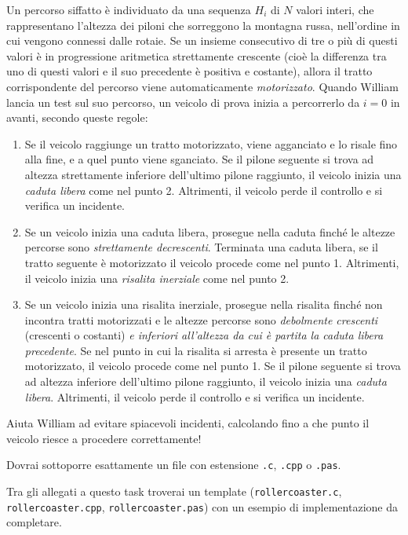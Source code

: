 	Un percorso siffatto \`e individuato da una sequenza $H_i$ di $N$ valori interi, che rappresentano l'altezza dei piloni che sorreggono la montagna russa, nell'ordine in cui vengono connessi dalle rotaie. Se un insieme consecutivo di tre o pi\`u di questi valori \`e in progressione aritmetica strettamente crescente (cio\`e la differenza tra uno di questi valori e il suo precedente \`e positiva e costante), allora il tratto corrispondente del percorso viene automaticamente \emph{motorizzato}. Quando William lancia un test sul suo percorso, un veicolo di prova inizia a percorrerlo da $i=0$ in avanti, secondo queste regole:
	\begin{enumerate}
		\item Se il veicolo raggiunge un tratto motorizzato, viene agganciato e lo risale fino alla fine, e a quel punto viene sganciato. Se il pilone seguente si trova ad altezza strettamente inferiore dell'ultimo pilone raggiunto, il veicolo inizia una \emph{caduta libera} come nel punto 2. Altrimenti, il veicolo perde il controllo e si verifica un incidente.
		\item Se un veicolo inizia una caduta libera, prosegue nella caduta finch\'e le altezze percorse sono \emph{strettamente decrescenti}. Terminata una caduta libera, se il tratto seguente \`e motorizzato il veicolo procede come nel punto 1. Altrimenti, il veicolo inizia una \emph{risalita inerziale} come nel punto 2.
		\item Se un veicolo inizia una risalita inerziale, prosegue nella risalita finch\'e non incontra tratti motorizzati e le altezze percorse sono \emph{debolmente crescenti} (crescenti o costanti) \emph{e inferiori all'altezza da cui \`e partita la caduta libera precedente}. Se nel punto in cui la risalita si arresta \`e presente un tratto motorizzato, il veicolo procede come nel punto 1. Se il pilone seguente si trova ad altezza inferiore dell'ultimo pilone raggiunto, il veicolo inizia una \emph{caduta libera}. Altrimenti, il veicolo perde il controllo e si verifica un incidente.
	\end{enumerate}
	
	Aiuta William ad evitare spiacevoli incidenti, calcolando fino a che punto il veicolo riesce a procedere correttamente!


\Implementation
Dovrai sottoporre esattamente un file con estensione \texttt{.c}, \texttt{.cpp} o \texttt{.pas}.

\begin{warning}
Tra gli allegati a questo task troverai un template (\texttt{rollercoaster.c}, \texttt{rollercoaster.cpp}, \texttt{rollercoaster.pas}) con un esempio di implementazione da completare.
\end{warning}

